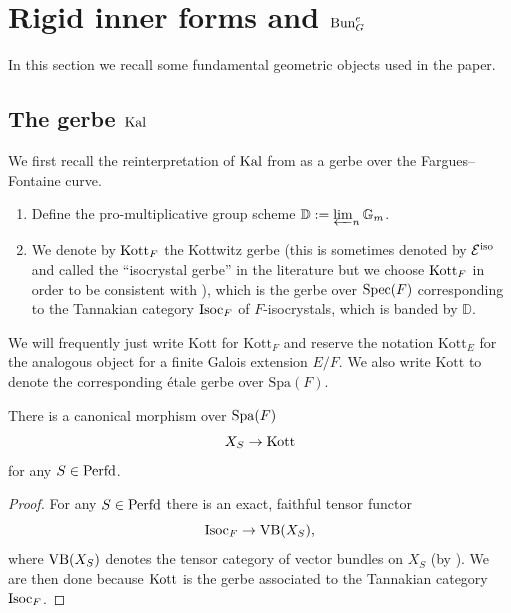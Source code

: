 \section{Rigid inner forms and $\mathrm{Bun}_{G}^e$}\label{sec:rigid-inner-forms}


In this section we recall some fundamental geometric objects used in the paper.

\subsection{The gerbe $\mathrm{Kal}$}
We first recall the reinterpretation of $\mathrm{Kal}$ from \cite{Fargues22} as a gerbe over the Fargues--Fontaine curve.

\begin{defi}
\begin{enumerate}
\item{Define the pro-multiplicative group scheme $\mathbb{D} := \varprojlim_{n} \mathbb{G}_{m}$.}
    \item{We denote by $\mathrm{Kott}_{F}$ the Kottwitz gerbe (this is sometimes denoted by $\mathcal{E}^{\textnormal{iso}}$ and called the ``isocrystal gerbe'' in the literature but we choose $\mathrm{Kott}_{F}$ in order to be consistent with \cite{Fargues22}), which is the gerbe over $\mathrm{Spec}(F)$ corresponding to the Tannakian category $\mathrm{Isoc}_{F}$ of $F$-isocrystals, which is banded by $\mathbb{D}$.}

\end{enumerate}
    We will frequently just write $\mathrm{Kott}$ for $\mathrm{Kott}_{F}$ and reserve the notation $\mathrm{Kott}_{E}$ for the analogous object for a finite Galois extension $E/F$. We also write $\mathrm{Kott}$ to denote the corresponding \'{e}tale gerbe over $\mathrm{Spa}(F)$.
\end{defi}

\begin{lem}\label{lem:maptoKott}
    There is a canonical morphism over $\mathrm{Spa}(F)$
    \begin{equation*}
        X_{S} \to \mathrm{Kott}
    \end{equation*}
    for any $S \in \mathrm{Perfd}$.
\end{lem}

\begin{proof}
For any $S \in \mathrm{Perfd}$ there is an exact, faithful tensor functor
\begin{equation*}
\textnormal{Isoc}_{F} \to \textnormal{VB}(X_{S}),
\end{equation*}
where $\textnormal{VB}(X_{S})$ denotes the tensor category of vector bundles on $X_{S}$ (by \cite[\S III.2.1]{Geometrization}). We are then done because $\mathrm{Kott}$ is the gerbe associated to the Tannakian category $\mathrm{Isoc}_{F}$. 
\end{proof}

